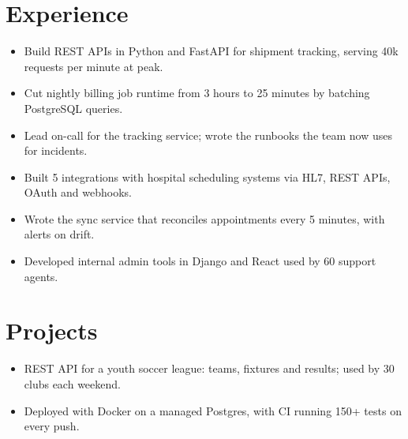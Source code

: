 \documentclass[10pt]{article}
\begin{document}

\section{Experience}

\begin{itemize}
  \item Build REST APIs in Python and FastAPI for shipment tracking, serving 40k requests per minute at peak.
  \item Cut nightly billing job runtime from 3 hours to 25 minutes by batching PostgreSQL queries.
  \item Lead on-call for the tracking service; wrote the runbooks the team now uses for incidents.
\end{itemize}

\begin{itemize}
  \item Built 5 integrations with hospital scheduling systems via HL7, REST APIs, OAuth and webhooks.
  \item Wrote the sync service that reconciles appointments every 5 minutes, with alerts on drift.
\end{itemize}

\begin{itemize}
  \item Developed internal admin tools in Django and React used by 60 support agents.
\end{itemize}


\section{Projects}

\begin{itemize}
  \item REST API for a youth soccer league: teams, fixtures and results; used by 30 clubs each weekend.
  \item Deployed with Docker on a managed Postgres, with CI running 150+ tests on every push.
\end{itemize}
\end{document}
